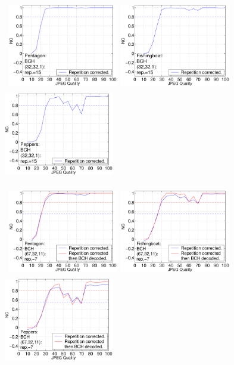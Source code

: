 \documentclass[12pt]{report}
\begin{document}
\begin{figure}[p]
\centerline{ \hbox{
\includegraphics[height=3.81cm,width=4.8cm]{EPS_BK_formattedBetter/ml32pent32.eps}
\includegraphics[height=3.81cm,width=4.8cm]{EPS_BK_formattedBetter/ml32fish32.eps}
\includegraphics[height=3.81cm,width=4.8cm]{EPS_BK_formattedBetter/ml32pep32.eps}
}}
 
\centerline{ \hbox{
\includegraphics[height=3.81cm,width=4.8cm]{EPS_BK_formattedBetter/ml32pent67.eps}
\includegraphics[height=3.81cm,width=4.8cm]{EPS_BK_formattedBetter/ml32fish67.eps}
\includegraphics[height=3.81cm,width=4.8cm]{EPS_BK_formattedBetter/ml32pep67.eps}
}}
 

\end{figure}
\end{document}
